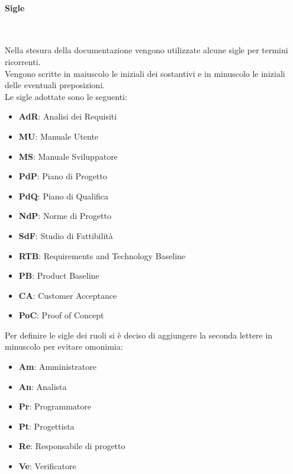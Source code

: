         \paragraph{Sigle} ~

        Nella stesura della documentazione vengono utilizzate alcune sigle per termini ricorrenti. \\
        Vengono scritte in maiuscolo le iniziali dei sostantivi e in minuscolo le iniziali delle eventuali preposizioni. \\
        Le sigle adottate sono le seguenti:
        \begin{itemize}
            \item \textbf{AdR}: Analisi dei Requisiti
            \item \textbf{MU}: Manuale Utente
            \item \textbf{MS}: Manuale Sviluppatore
            \item \textbf{PdP}: Piano di Progetto
            \item \textbf{PdQ}: Piano di Qualifica
            \item \textbf{NdP}: Norme di Progetto
            \item \textbf{SdF}: Studio di Fattibilità
            \item \textbf{RTB}: Requirements and Technology Baseline
            \item \textbf{PB}: Product Baseline
            \item \textbf{CA}: Customer Acceptance
            \item \textbf{PoC}: Proof of Concept
        \end{itemize}

        Per definire le sigle dei ruoli si è deciso di aggiungere la seconda lettere in minuscolo per evitare omonimia:
        \begin{itemize}
            \item \textbf{Am}: Amministratore
            \item \textbf{An}: Analista
            \item \textbf{Pr}: Programmatore
            \item \textbf{Pt}: Progettista
            \item \textbf{Re}: Responsabile di progetto
            \item \textbf{Ve}: Verificatore
        \end{itemize}


